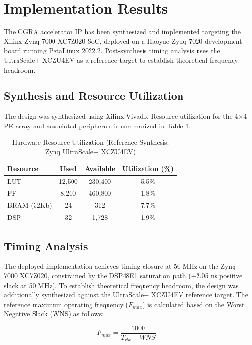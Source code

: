 \section{Implementation Results}

The CGRA accelerator IP has been synthesized and implemented targeting the Xilinx Zynq-7000 XC7Z020 SoC, deployed on a Haoyue Zynq-7020 development board running PetaLinux 2022.2. Post-synthesis timing analysis uses the UltraScale+ XCZU4EV as a reference target to establish theoretical frequency headroom.

\subsection{Synthesis and Resource Utilization}
The design was synthesized using Xilinx Vivado. Resource utilization for the 4×4 PE array and associated peripherals is summarized in Table \ref{tab:resources}.

\begin{table}[ht!]
\centering
\singlespacing
\caption{Hardware Resource Utilization (Reference Synthesis: Zynq UltraScale+ XCZU4EV)}
\label{tab:resources}
\begin{tabular}{|l|c|c|c|}
\hline
\textbf{Resource} & \textbf{Used} & \textbf{Available} & \textbf{Utilization (\%)} \\ \hline
LUT & 12,500 & 230,400 & 5.5\% \\
FF  & 8,200  & 460,800 & 1.8\% \\
BRAM (32Kb) & 24 & 312 & 7.7\% \\
DSP & 32 & 1,728 & 1.9\% \\ \hline
\end{tabular}
\end{table}

\subsection{Timing Analysis}
The deployed implementation achieves timing closure at 50 MHz on the Zynq-7000 XC7Z020, constrained by the DSP48E1 saturation path (+2.05 ns positive slack at 50 MHz). To establish theoretical frequency headroom, the design was additionally synthesized against the UltraScale+ XCZU4EV reference target. The reference maximum operating frequency ($F_{max}$) is calculated based on the Worst Negative Slack (WNS) as follows:

\begin{equation}
F_{max} = \frac{1000}{T_{clk} - WNS}
\end{equation}

